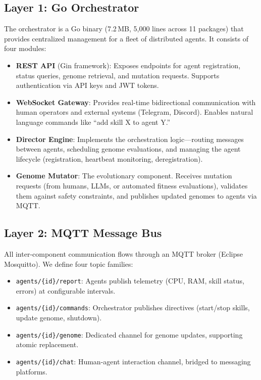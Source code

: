 \documentclass{article}
\newcommand{\topic}[1]{\texttt{#1}}
\begin{document}
\subsection{Layer 1: Go Orchestrator}
\label{sec:orchestrator}

The orchestrator is a Go binary (7.2\,MB, 5,000 lines across 11 packages) that provides centralized management for a fleet of distributed agents. It consists of four modules:

\begin{itemize}[leftmargin=*]
    \item \textbf{REST API} (Gin framework): Exposes endpoints for agent registration, status queries, genome retrieval, and mutation requests. Supports authentication via API keys and JWT tokens.
    
    \item \textbf{WebSocket Gateway}: Provides real-time bidirectional communication with human operators and external systems (Telegram, Discord). Enables natural language commands like ``add skill X to agent Y.''
    
    \item \textbf{Director Engine}: Implements the orchestration logic---routing messages between agents, scheduling genome evaluations, and managing the agent lifecycle (registration, heartbeat monitoring, deregistration).
    
    \item \textbf{Genome Mutator}: The evolutionary component. Receives mutation requests (from humans, LLMs, or automated fitness evaluations), validates them against safety constraints, and publishes updated genomes to agents via MQTT.
\end{itemize}

\subsection{Layer 2: MQTT Message Bus}

All inter-component communication flows through an MQTT broker (Eclipse Mosquitto). We define four topic families:

\begin{itemize}[leftmargin=*]
    \item \topic{agents/\{id\}/report}: Agents publish telemetry (CPU, RAM, skill status, errors) at configurable intervals.
    \item \topic{agents/\{id\}/commands}: Orchestrator publishes directives (start/stop skills, update genome, shutdown).
    \item \topic{agents/\{id\}/genome}: Dedicated channel for genome updates, supporting atomic replacement.
    \item \topic{agents/\{id\}/chat}: Human-agent interaction channel, bridged to messaging platforms.
\end{itemize}
\end{document}
